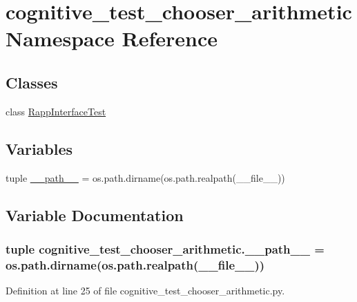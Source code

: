 \hypertarget{namespacecognitive__test__chooser__arithmetic}{\section{cognitive\-\_\-test\-\_\-chooser\-\_\-arithmetic Namespace Reference}
\label{namespacecognitive__test__chooser__arithmetic}
}
\subsection*{Classes}
\begin{DoxyCompactItemize}
\item 
class \hyperlink{classcognitive__test__chooser__arithmetic_1_1RappInterfaceTest}{Rapp\-Interface\-Test}
\end{DoxyCompactItemize}
\subsection*{Variables}
\begin{DoxyCompactItemize}
\item 
tuple \hyperlink{namespacecognitive__test__chooser__arithmetic_a2ee0960fbe961f99e1c8054cf8cf5947}{\-\_\-\-\_\-path\-\_\-\-\_\-} = os.\-path.\-dirname(os.\-path.\-realpath(\-\_\-\-\_\-file\-\_\-\-\_\-))
\end{DoxyCompactItemize}


\subsection{Variable Documentation}
\hypertarget{namespacecognitive__test__chooser__arithmetic_a2ee0960fbe961f99e1c8054cf8cf5947}{
\subsubsection[{\-\_\-\-\_\-path\-\_\-\-\_\-}]{\setlength{\rightskip}{0pt plus 5cm}tuple cognitive\-\_\-test\-\_\-chooser\-\_\-arithmetic.\-\_\-\-\_\-path\-\_\-\-\_\- = os.\-path.\-dirname(os.\-path.\-realpath(\-\_\-\-\_\-file\-\_\-\-\_\-))}}\label{namespacecognitive__test__chooser__arithmetic_a2ee0960fbe961f99e1c8054cf8cf5947}


Definition at line 25 of file cognitive\-\_\-test\-\_\-chooser\-\_\-arithmetic.\-py.

